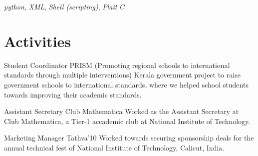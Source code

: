 \documentclass[11pt,a4paper,sans]{moderncv}
\begin{document}
           {
               \textit{python},
               \textit{XML},
               \textit{Shell (scripting)},
               \textit{Plait}
           }
           {\textit{C}}


\section{Activities}

            {Student Coordinator}
            {
                PRISM (Promoting regional schools to international standards
                through multiple interventions)
            }
            {}
            {}
            {
                Kerala government project to raise government schools to
                international standards, where we helped school students towards
                improving their academic standards.
            }

            {Assistant Secretary}
            {Club Mathematica}
            {}
            {}
            {
                Worked as the Assistant Secretary at Club Mathematica, a Tier-1
                accademic club at National Institute of Technology.
            }

            {Marketing Manager}
            {Tathva'10}
            {}
            {}
            {
                Worked towards securing sponsorship deals for the annual
                technical fest of National Institute of Technology, Calicut,
                India.
            }


%


%

\end{document}
